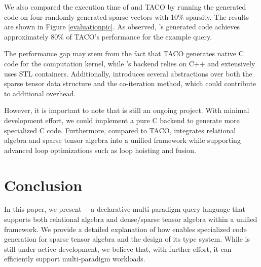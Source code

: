 \documentclass[acmsmall,nonacm]{acmart}\settopmatter{printfolios=true,printccs=false,printacmref=false}
\newcommand{\rhyme}{\text{Rhyme}\xspace}
\begin{document}

We also compared the execution time of \rhyme and TACO by running the generated code on four randomly generated sparse vectors with 10$\%$ sparsity. The results are shown in Figure \ref{evaluationpic}. As observed, \rhyme's generated code achieves approximately $80\%$ of TACO's performance for the example query.\par
The performance gap may stem from the fact that TACO generates native C code for the computation kernel, while \rhyme's backend relies on C++ and extensively uses STL containers. Additionally, \rhyme introduces several abstractions over both the sparse tensor data structure and the co-iteration method, which could contribute to additional overhead.\par
However, it is important to note that \rhyme is still an ongoing project. With minimal development effort, we could implement a pure C backend to generate more specialized C code. Furthermore, compared to TACO, \rhyme integrates relational algebra and sparse tensor algebra into a unified framework while supporting advanced loop optimizations such as loop hoisting and fusion.
\section{Conclusion}\label{conclusion}

In this paper, we present \rhyme—a declarative multi-paradigm query language that supports both relational algebra and dense/sparse tensor algebra within a unified framework. We provide a detailed explanation of how \rhyme enables specialized code generation for sparse tensor algebra and the design of its type system. While \rhyme is still under active development, we believe that, with further effort, it can efficiently support multi-paradigm workloads.


\end{document}
